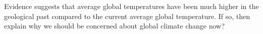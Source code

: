 \question[5]
Evidence suggests that average global temperatures have been much higher in the geological past compared to the current average global temperature. If so, then explain why we should be concerned about global climate change now? 

